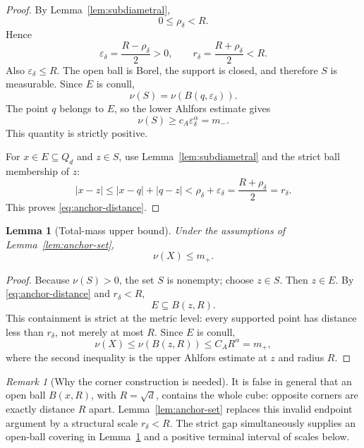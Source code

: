 \documentclass[11pt]{article}
\newtheorem{lemma}[theorem]{Lemma}
\theoremstyle{remark}
\newtheorem{remark}[theorem]{Remark}
\newcommand{\Cube}{Q_d}
\begin{document}
\begin{proof}
By Lemma~\ref{lem:subdiametral},
\[
  0\leq\rho_\delta<R.
\]
Hence
\[
  \varepsilon_\delta=\frac{R-\rho_\delta}{2}>0,
  \qquad
  r_\delta=\frac{R+\rho_\delta}{2}<R.
\]
Also \(\varepsilon_\delta\leq R\).  The open ball is Borel, the support is
closed, and therefore \(S\) is measurable.  Since \(E\) is conull,
\[
  \nu(S)=\nu(B(q,\varepsilon_\delta)).
\]
The point \(q\) belongs to \(E\), so the lower Ahlfors estimate gives
\[
  \nu(S)
  \geq
  c_A\varepsilon_\delta^\alpha
  =
  m_-.
\]
This quantity is strictly positive.

For \(x\in E\subseteq\Cube\) and \(z\in S\), use
Lemma~\ref{lem:subdiametral} and the strict ball membership of \(z\):
\[
  \lvert x-z\rvert
  \leq
  \lvert x-q\rvert+\lvert q-z\rvert
  <
  \rho_\delta+\varepsilon_\delta
  =
  \frac{R+\rho_\delta}{2}
  =
  r_\delta.
\]
This proves \eqref{eq:anchor-distance}.
\end{proof}

\begin{lemma}[Total-mass upper bound]                                      \label{lem:total-mass-upper}
Under the assumptions of Lemma~\ref{lem:anchor-set},
\begin{equation}
  \nu(X)\leq m_+.                                                          \label{eq:total-mass-upper}
\end{equation}
\end{lemma}

\begin{proof}
Because \(\nu(S)>0\), the set \(S\) is nonempty; choose \(z\in S\).  Then
\(z\in E\).  By \eqref{eq:anchor-distance} and \(r_\delta<R\),
\[
  E\subseteq B(z,R).
\]
This containment is strict at the metric level: every supported point has
distance less than \(r_\delta\), not merely at most \(R\).  Since \(E\) is
conull,
\[
  \nu(X)
  \leq
  \nu(B(z,R))
  \leq
  C_A R^\alpha
  =
  m_+,
\]
where the second inequality is the upper Ahlfors estimate at \(z\) and
radius \(R\).
\end{proof}

\begin{remark}[Why the corner construction is needed]
It is false in general that an open ball \(B(x,R)\), with
\(R=\sqrt d\), contains the whole cube: opposite corners are exactly
distance \(R\) apart.  Lemma~\ref{lem:anchor-set} replaces this invalid
endpoint argument by a structural scale \(r_\delta<R\).  The strict gap
simultaneously supplies an open-ball covering in
Lemma~\ref{lem:total-mass-upper} and a positive terminal interval of scales
below.
\end{remark}
\end{document}
